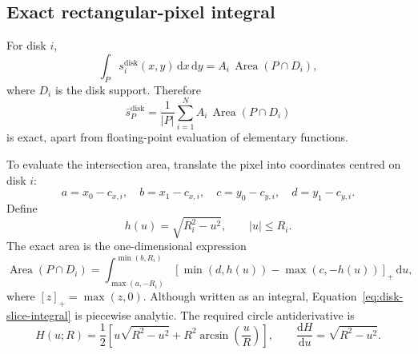 \documentclass[11pt,a4paper]{article}
\newcommand{\Area}{\operatorname{Area}}
\begin{document}
\subsection{Exact rectangular-pixel integral}

For disk $i$,
\begin{equation}
\int_P s_i^{\mathrm{disk}}(x,y)\,\mathrm{d}x\,\mathrm{d}y
=
A_i\,\Area(P\cap D_i),
\label{eq:disk-area-basic}
\end{equation}
where $D_i$ is the disk support. Therefore
\begin{equation}
\boxed{
\bar{s}^{\mathrm{disk}}_P
=
\frac{1}{|P|}
\sum_{i=1}^{N}A_i\,\Area(P\cap D_i)
}
\label{eq:disk-pixel-average}
\end{equation}
is exact, apart from floating-point evaluation of elementary functions.

To evaluate the intersection area, translate the pixel into coordinates centred
on disk $i$:
\begin{equation}
a=x_0-c_{x,i},\quad b=x_1-c_{x,i},\quad
c=y_0-c_{y,i},\quad d=y_1-c_{y,i}.
\end{equation}
Define
\begin{equation}
h(u)=\sqrt{R_i^2-u^2},\qquad |u|\le R_i.
\end{equation}
The exact area is the one-dimensional expression
\begin{equation}
\Area(P\cap D_i)
=
\int_{\max(a,-R_i)}^{\min(b,R_i)}
\left[
\min\!\left(d,h(u)\right)
-
\max\!\left(c,-h(u)\right)
\right]_+\,\mathrm{d}u,
\label{eq:disk-slice-integral}
\end{equation}
where $[z]_+=\max(z,0)$. Although written as an integral,
Equation~\eqref{eq:disk-slice-integral} is piecewise analytic. The required
circle antiderivative is
\begin{equation}
H(u;R)
=
\frac{1}{2}
\left[
 u\sqrt{R^2-u^2}
 +R^2\arcsin\!\left(\frac{u}{R}\right)
\right],
\qquad
\frac{\mathrm{d}H}{\mathrm{d}u}=\sqrt{R^2-u^2}.
\label{eq:circle-antiderivative}
\end{equation}
\end{document}
